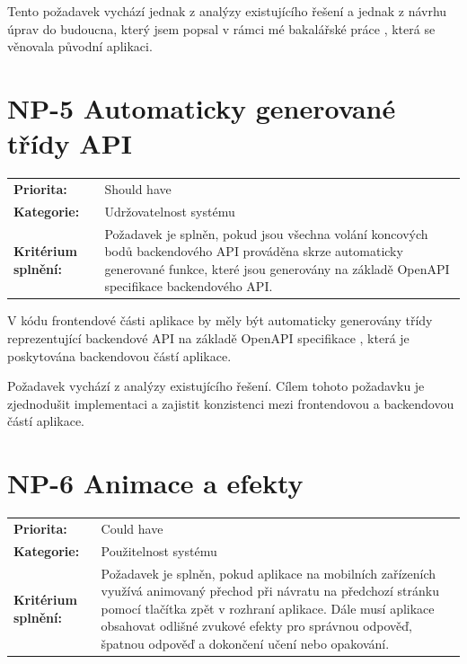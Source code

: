 Tento požadavek vychází jednak z analýzy existujícího řešení a jednak z návrhu úprav do budoucna, který jsem popsal v rámci mé bakalářské práce \cite{Jenicek2024BachelorThesis}, která se věnovala původní aplikaci.

\section{NP-5 Automaticky generované třídy API}\label{sec:np-generated-api-classes}

\begin{tabularx}{\linewidth}{lX}
    \textbf{Priorita:} & Should have \\
    \textbf{Kategorie:} & Udržovatelnost systému \\
    \textbf{Kritérium splnění:} & Požadavek je splněn, pokud jsou všechna volání koncových bodů backendového API prováděna skrze automaticky generované funkce, které jsou generovány na základě OpenAPI specifikace backendového API. \\
\end{tabularx}

V kódu frontendové části aplikace by měly být automaticky generovány třídy reprezentující backendové API na základě OpenAPI specifikace \cite{OpenAPISpecification}, která je poskytována backendovou částí aplikace.

Požadavek vychází z analýzy existujícího řešení. Cílem tohoto požadavku je zjednodušit implementaci a zajistit konzistenci mezi frontendovou a backendovou částí aplikace.

\section{NP-6 Animace a efekty}\label{sec:np-animations-effects}

\begin{tabularx}{\linewidth}{lX}
    \textbf{Priorita:} & Could have \\
    \textbf{Kategorie:} & Použitelnost systému \\
    \textbf{Kritérium splnění:} & Požadavek je splněn, pokud aplikace na mobilních zařízeních využívá animovaný přechod při návratu na předchozí stránku pomocí tlačítka zpět v rozhraní aplikace. Dále musí aplikace obsahovat odlišné zvukové efekty pro správnou odpověď, špatnou odpověď a dokončení učení nebo opakování. \\
\end{tabularx}

